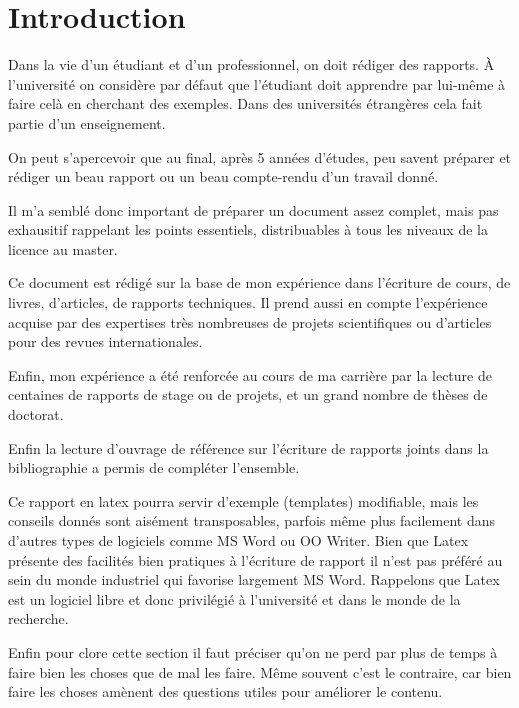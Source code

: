 \label{sec:introduction}
\section{Introduction}

Dans la vie d'un étudiant et d'un professionnel, on doit rédiger des rapports. \`A l'université on considère
par défaut que l'étudiant doit apprendre par lui-même à faire celà en cherchant des exemples. Dans des universités
étrangères cela fait partie d'un enseignement. 

On peut s'apercevoir que au final, après 5 années d'études, peu savent préparer et rédiger un beau rapport ou un beau compte-rendu
d'un travail donné.

Il m'a semblé donc important de préparer un document assez complet, mais pas exhausitif rappelant les points essentiels,
distribuables à tous les niveaux de la licence au master. 

Ce document est rédigé sur la base de mon expérience dans l'écriture de cours,
 de livres, d'articles, de rapports techniques.
 Il prend aussi en compte  l'expérience acquise par des expertises très nombreuses de projets scientifiques ou d'articles pour des revues internationales.

Enfin, mon expérience a été renforcée  au cours de ma carrière par la lecture  de centaines de rapports
de stage ou de projets, et un grand nombre de thèses de doctorat.

Enfin la lecture d'ouvrage de référence sur l'écriture de rapports joints dans la bibliographie a permis de compléter l'ensemble.
 
Ce rapport en latex pourra servir d'exemple (templates) modifiable, mais les conseils donnés sont aisément transposables, 
parfois même plus facilement dans d'autres types de logiciels comme MS Word ou OO Writer.
Bien que  Latex présente des facilités  bien pratiques à l'écriture de rapport il n'est pas préféré au sein du monde industriel
qui favorise largement MS Word. Rappelons que Latex est un logiciel libre et 
donc privilégié à l'université et dans le monde de la recherche.
 
Enfin pour clore cette section il faut préciser qu'on ne perd par plus de temps à faire bien les choses que de mal les faire.
Même souvent c'est le contraire, car bien faire les choses amènent des questions utiles pour améliorer le contenu.


